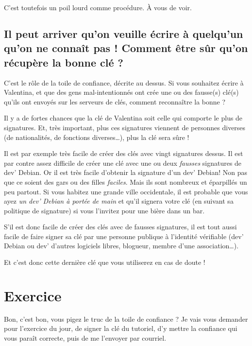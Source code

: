 C'est toutefois un poil lourd comme procédure. À vous de voir.

\subsection{Il peut arriver qu'on veuille écrire à quelqu'un qu'on ne
connaît pas ! Comment être sûr qu'on récupère la bonne clé
?}\label{il-peut-arriver-quon-veuille-uxe9crire-uxe0-quelquun-quon-ne-connauxeet-pas-comment-uxeatre-suxfbr-quon-ruxe9cupuxe8re-la-bonne-cluxe9}

C'est le rôle de la toile de confiance, décrite au dessus. Si vous souhaitez écrire à Valentina, et que des gens mal-intentionnés
ont crée une ou des fausse(s) clé(s) qu'ils ont envoyés sur les serveurs
de clés, comment reconnaître la bonne ?

Il y a de fortes chances que la clé de Valentina soit celle qui comporte
le plus de signatures. Et, très important, plus ces signatures viennent
de personnes diverses (de nationalités, de fonctions diverses\ldots{}),
plus la clé sera sûre !

Il est par exemple très facile de créer des clés avec vingt signatures
dessus. Il est par contre assez difficile de créer une clé avec une ou deux
\emph{fausses} signatures de dev' Debian. Or il est très facile
d'obtenir la signature d'un dev' Debian! Non pas que ce soient des gars
ou des filles \emph{faciles}. Mais ils sont nombreux et éparpillés un
peu partout. Si vous habitez une grande ville occidentale, il est
probable que vous ayez \emph{un dev' Debian à portée de main} et qu'il
signera votre clé (en suivant sa politique de signature) si vous
l'invitez pour une bière dans un bar.

S'il est donc facile de créer des clés avec de fausses signatures, il
est tout aussi facile de faire signer sa clé par une personne publique à
l'identité vérifiable (dev' Debian ou dev' d'autres logiciels libres,
blogueur, membre d'une association\ldots{}).

Et c'est donc cette dernière clé que vous utiliserez en cas de doute !

\section{Exercice}\label{exercice}

Bon, c'est bon, vous pigez le truc de la toile de confiance ? Je vais vous demander pour l'exercice du jour, de signer la clé du
tutoriel, d'y mettre la confiance qui vous paraît correcte, puis de me
l'envoyer par courriel.

